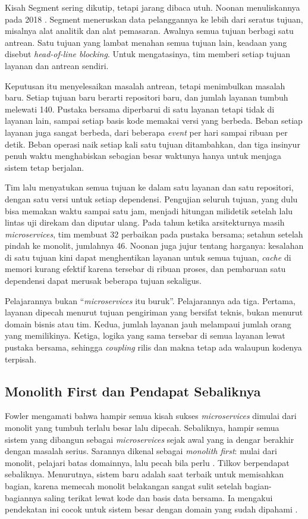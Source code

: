 Kisah Segment sering dikutip, tetapi jarang dibaca utuh. Noonan menuliskannya pada 2018
\cite{noonan2018}. Segment meneruskan data pelanggannya ke lebih dari seratus tujuan, misalnya
alat analitik dan alat pemasaran. Awalnya semua tujuan berbagi satu antrean. Satu tujuan yang lambat
menahan semua tujuan lain, keadaan yang disebut \textit{head-of-line blocking}. Untuk mengatasinya,
tim memberi setiap tujuan layanan dan antrean sendiri.

Keputusan itu menyelesaikan masalah antrean, tetapi menimbulkan masalah baru. Setiap tujuan baru
berarti repositori baru, dan jumlah layanan tumbuh melewati 140. Pustaka bersama diperbarui di satu
layanan tetapi tidak di layanan lain, sampai setiap basis kode memakai versi yang berbeda. Beban
setiap layanan juga sangat berbeda, dari beberapa \textit{event} per hari sampai ribuan per detik.
Beban operasi naik setiap kali satu tujuan ditambahkan, dan tiga insinyur penuh waktu menghabiskan
sebagian besar waktunya hanya untuk menjaga sistem tetap berjalan.

Tim lalu menyatukan semua tujuan ke dalam satu layanan dan satu repositori, dengan satu versi untuk
setiap dependensi. Pengujian seluruh tujuan, yang dulu bisa memakan waktu sampai satu jam, menjadi
hitungan milidetik setelah lalu lintas uji direkam dan diputar ulang. Pada tahun ketika arsitekturnya
masih \textit{microservices}, tim membuat 32 perbaikan pada pustaka bersama; setahun setelah pindah
ke monolit, jumlahnya 46. Noonan juga jujur tentang harganya: kesalahan di satu tujuan kini dapat
menghentikan layanan untuk semua tujuan, \textit{cache} di memori kurang efektif karena tersebar di
ribuan proses, dan pembaruan satu dependensi dapat merusak beberapa tujuan sekaligus.

Pelajarannya bukan ``\textit{microservices} itu buruk''. Pelajarannya ada tiga. Pertama, layanan
dipecah menurut tujuan pengiriman yang bersifat teknis, bukan menurut domain bisnis atau tim. Kedua,
jumlah layanan jauh melampaui jumlah orang yang memilikinya. Ketiga, logika yang sama tersebar di
semua layanan lewat pustaka bersama, sehingga \textit{coupling} rilis dan makna tetap ada walaupun
kodenya terpisah.

\subsection{Monolith First dan Pendapat Sebaliknya}

Fowler mengamati bahwa hampir semua kisah sukses \textit{microservices} dimulai dari monolit yang
tumbuh terlalu besar lalu dipecah. Sebaliknya, hampir semua sistem yang dibangun sebagai
\textit{microservices} sejak awal yang ia dengar berakhir dengan masalah serius. Sarannya dikenal
sebagai \textit{monolith first}: mulai dari monolit, pelajari batas domainnya, lalu pecah bila perlu
\cite{c07-fowler2015}. Tilkov berpendapat sebaliknya. Menurutnya, sistem baru adalah saat terbaik
untuk memisahkan bagian, karena memecah monolit belakangan sangat sulit setelah bagian-bagiannya
saling terikat lewat kode dan basis data bersama. Ia mengakui pendekatan ini cocok untuk sistem
besar dengan domain yang sudah dipahami \cite{c07-tilkov2015}.


